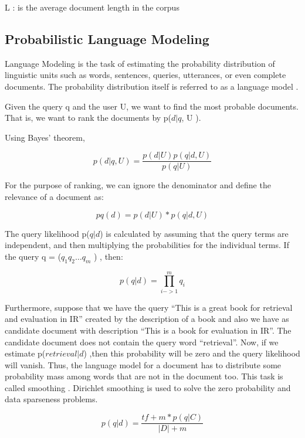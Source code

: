 L : is the average document length in the corpus

\subsection{Probabilistic Language Modeling}

Language Modeling is the task of estimating the probability distribution of linguistic units such as words, sentences, queries, utterances, or even complete documents. The probability distribution itself is referred to as a language model \cite{CroftLafferty}.


Given the query q and the user U, we want to find the most probable documents. That is, we want to rank the documents by p($d|q$, U ).

Using Bayes' theorem,

\begin{equation}
p(d|q, U ) = \frac{p(d|U )p(q|d, U )} {p(q|U)}
\end{equation}

For the purpose of ranking, we can ignore the denominator and define the relevance of a document as:

\begin{equation}
pq (d) = p(d|U ) * p(q|d, U )
\end{equation}

The query likelihood p($q|d$) is calculated by assuming that the query terms are independent, and then multiplying the probabilities for the individual terms. If the query q = ($q_1 q_2 \ldots q_m$ ) , then:

\[p(q|d) =\prod_{i->1}^{m} q_i\]


Furthermore, suppose that we have the query ``This is a great book for retrieval and evaluation in IR'' created by the description of a book and also we have as candidate document with description ``This is a book for evaluation in IR''. The candidate document does not contain the query word ``retrieval''. Now, if we estimate p($retrieval|d$) ,then this probability will be zero and the query likelihood will vanish. Thus, the language model for a document has to distribute some probability mass among words that are not in the document too. This task is called smoothing  \cite{ZhaiLaferty}. Dirichlet smoothing is used to solve the zero probability and data sparseness problems.

\begin{equation}
p(q|d) =\frac{tf + m * p(q|C) }{|D| + m}
\end{equation}



